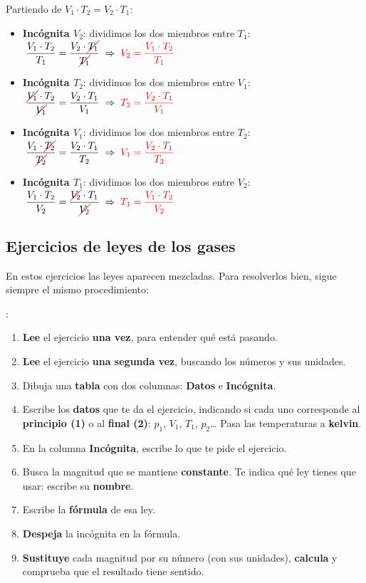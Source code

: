 Partiendo de \(V_1 \cdot T_2 = V_2 \cdot T_1\):
\begin{itemize}
    \item \textbf{Incógnita \(V_2\)}: dividimos los dos miembros entre \(T_1\):
    \(\;\dfrac{V_1 \cdot T_2}{T_1} = \dfrac{V_2 \cdot \cancelred{T_1}}{\cancelred{T_1}} \;\Rightarrow\; \textcolor{red}{V_2 = \dfrac{V_1 \cdot T_2}{T_1}}\)
    \item \textbf{Incógnita \(T_2\)}: dividimos los dos miembros entre \(V_1\):
    \(\;\dfrac{\cancelred{V_1} \cdot T_2}{\cancelred{V_1}} = \dfrac{V_2 \cdot T_1}{V_1} \;\Rightarrow\; \textcolor{red}{T_2 = \dfrac{V_2 \cdot T_1}{V_1}}\)
    \item \textbf{Incógnita \(V_1\)}: dividimos los dos miembros entre \(T_2\):
    \(\;\dfrac{V_1 \cdot \cancelred{T_2}}{\cancelred{T_2}} = \dfrac{V_2 \cdot T_1}{T_2} \;\Rightarrow\; \textcolor{red}{V_1 = \dfrac{V_2 \cdot T_1}{T_2}}\)
    \item \textbf{Incógnita \(T_1\)}: dividimos los dos miembros entre \(V_2\):
    \(\;\dfrac{V_1 \cdot T_2}{V_2} = \dfrac{\cancelred{V_2} \cdot T_1}{\cancelred{V_2}} \;\Rightarrow\; \textcolor{red}{T_1 = \dfrac{V_1 \cdot T_2}{V_2}}\)
\end{itemize}


\subsection{Ejercicios de leyes de los gases}

En estos ejercicios las leyes aparecen mezcladas. Para resolverlos bien, sigue siempre el mismo procedimiento:

:
\begin{enumerate}[label=\numberballmDarkTeal]
    \item \textbf{Lee} el ejercicio \textbf{una vez}, para entender qué está pasando.
    \item \textbf{Lee} el ejercicio \textbf{una segunda vez}, buscando los números y sus unidades.
    \item Dibuja una \textbf{tabla} con dos columnas: \textbf{Datos} e \textbf{Incógnita}.
    \item Escribe los \textbf{datos} que te da el ejercicio, indicando si cada uno corresponde al \textbf{principio (1)} o al \textbf{final (2)}: \(p_1\), \(V_1\), \(T_1\), \(p_2\)\ldots{} Pasa las temperaturas a \textbf{kelvin}.
    \item En la columna \textbf{Incógnita}, escribe lo que te pide el ejercicio.
    \item Busca la magnitud que se mantiene \textbf{constante}. Te indica qué ley tienes que usar: escribe su \textbf{nombre}.
    \item Escribe la \textbf{fórmula} de esa ley.
    \item \textbf{Despeja} la incógnita en la fórmula.
    \item \textbf{Sustituye} cada magnitud por su número (con sus unidades), \textbf{calcula} y comprueba que el resultado tiene sentido.
\end{enumerate}


